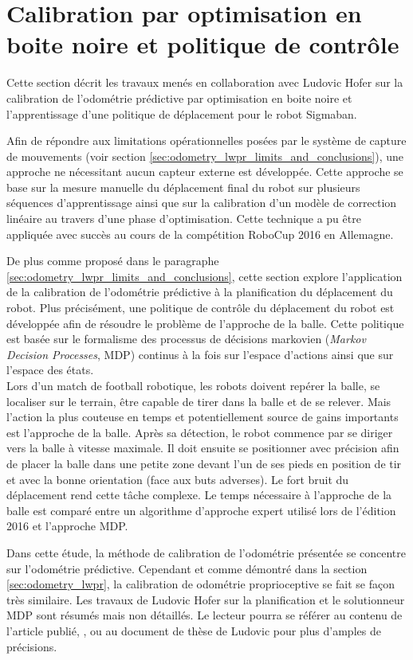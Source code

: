 
\section{Calibration par optimisation en boite noire et politique de contrôle\label{sec:odometry_cmaes}}

Cette section décrit les travaux menés en collaboration avec Ludovic Hofer sur
la calibration de l'odométrie prédictive par optimisation en boite noire et 
l'apprentissage d'une politique de déplacement pour le robot Sigmaban.

Afin de répondre aux limitations opérationnelles posées par le 
système de capture de mouvements (voir section \ref{sec:odometry_lwpr_limits_and_conclusions}),
une approche ne nécessitant aucun capteur externe est développée.
Cette approche se base sur la mesure manuelle du déplacement final du robot 
sur plusieurs séquences d'apprentissage ainsi que sur la
calibration d'un modèle de correction linéaire au travers d'une phase d'optimisation.
Cette technique a pu être appliquée avec succès au cours de la compétition 
RoboCup 2016 en Allemagne.

De plus comme proposé dans le paragraphe \ref{sec:odometry_lwpr_limits_and_conclusions}, 
cette section explore l'application de la calibration de l'odométrie prédictive
à la planification du déplacement du robot.
Plus précisément, une politique de contrôle du déplacement du robot 
est développée afin de résoudre le problème de l'approche de la balle.
Cette politique est basée sur le formalisme des processus de décisions markovien 
(\textit{Markov Decision Processes}, MDP) continus à la fois sur l'espace d'actions 
ainsi que sur l'espace des états.\\

Lors d'un match de football robotique, les robots doivent repérer la balle, 
se localiser sur le terrain, être capable de tirer dans la balle et de se relever. 
Mais l'action la plus couteuse en temps et potentiellement source de gains importants
est l'approche de la balle. Après sa détection, le robot commence par 
se diriger vers la balle à vitesse maximale.
Il doit ensuite se positionner avec précision
afin de placer la balle dans une petite zone devant l'un de ses pieds en position de
tir et avec la bonne orientation (face aux buts adverses).
Le fort bruit du déplacement rend cette tâche complexe.
Le temps nécessaire à l'approche de la balle est comparé entre un algorithme 
d'approche expert utilisé lors de l'édition 2016 et l'approche MDP.

Dans cette étude, la méthode de calibration de l'odométrie présentée se concentre
sur l'odométrie prédictive. Cependant et comme démontré dans la section \ref{sec:odometry_lwpr},
la calibration de odométrie proprioceptive se fait se façon très similaire.
Les travaux de Ludovic Hofer sur la planification et le solutionneur MDP 
sont résumés mais non détaillés.
Le lecteur pourra se référer au contenu de l'article publié, \cite{ApproachICAPS2017}, 
ou au document de thèse de Ludovic pour plus d'amples de précisions.

